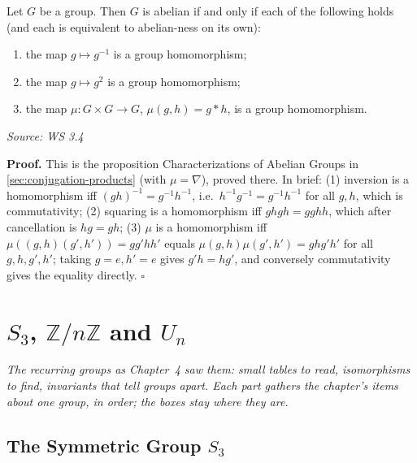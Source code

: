 \documentclass[11pt]{report}
\renewenvironment{proof}[1][Proof]{\noindent\textbf{#1.} }{\hfill$\square$\par\vspace{5pt}}
\newcommand{\srcline}[1]{\par\hfill{\footnotesize\textit{Source: #1}}}
\begin{document}
\begin{propbox}\label{prop:characterizations-abelian-groups-worksheet-form}
Let $G$ be a group. Then $G$ is abelian if and only if each of the following holds (and each is equivalent to abelian-ness on its own):
\begin{enumerate}
    \item the map $g \mapsto g^{-1}$ is a group homomorphism;
    \item the map $g \mapsto g^2$ is a group homomorphism;
    \item the map $\mu: G \times G \to G$, $\mu(g, h) = g * h$, is a group homomorphism.
\end{enumerate}
\srcline{WS 3.4}
\end{propbox}

\begin{proof}
This is the proposition Characterizations of Abelian Groups in \ref{sec:conjugation-products} (with $\mu = \nabla$), proved there. In brief: (1) inversion is a homomorphism iff $(gh)^{-1} = g^{-1}h^{-1}$, i.e.\ $h^{-1}g^{-1} = g^{-1}h^{-1}$ for all $g, h$, which is commutativity; (2) squaring is a homomorphism iff $ghgh = gghh$, which after cancellation is $hg = gh$; (3) $\mu$ is a homomorphism iff $\mu((g,h)(g',h')) = gg'hh'$ equals $\mu(g,h)\mu(g',h') = ghg'h'$ for all $g, h, g', h'$; taking $g = e, h' = e$ gives $g'h = hg'$, and conversely commutativity gives the equality directly.
\end{proof}


\section{\texorpdfstring{$S_3$, $\mathbb{Z}/n\mathbb{Z}$ and $U_n$}{S₃, ℤ/nℤ and Uₙ}}\label{sec:rev-ch4}

\textit{The recurring groups as Chapter~4 saw them: small tables to read, isomorphisms to find, invariants that tell groups apart. Each part gathers the chapter's items about one group, in order; the boxes stay where they are.}

\subsection{\texorpdfstring{The Symmetric Group $S_3$}{The Symmetric Group S₃}}\label{sec:rev-ch4-s3}
\end{document}
